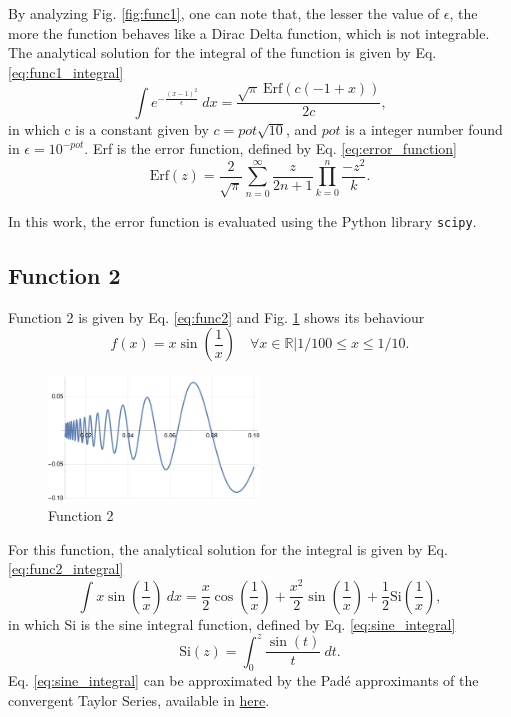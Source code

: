 By analyzing Fig. \ref{fig:func1}, one can note that, the lesser the value of $\epsilon$, the more the function behaves like a Dirac Delta function, which is not integrable. The analytical solution for the integral of the function is given by Eq. \eqref{eq:func1_integral}
\begin{equation}
    \label{eq:func1_integral}
    \int e^{-\frac{(x-1)^2}{\epsilon}} ~dx= \frac{\sqrt{\pi} ~\text{Erf}\left(c (- 1 + x)\right)}{2 c},
\end{equation}
in which c is a constant given by $c = pot\sqrt{10}$, and $pot$ is a integer number found in $\epsilon = 10^{-pot}$. Erf is the error function, defined by Eq. \eqref{eq:error_function}
\begin{equation}
    \label{eq:error_function}
    \text{Erf}(z) = \frac{2}{\sqrt{\pi}} \sum_{n=0}^{\infty} \frac{z}{2n + 1} \prod_{k=0}^{n} \frac{-z^2}{k}.
\end{equation}

In this work, the error function is evaluated using the Python library \texttt{scipy}.
\subsection{Function 2}
Function 2 is given by Eq. \eqref{eq:func2} and Fig. \ref{fig:func2} shows its behaviour
\begin{equation}
    \label{eq:func2}
    f(x) = x\sin\left(\frac{1}{x}\right) \quad \forall x \in \mathbb{R} | 1/100 \leq x \leq 1/10.
\end{equation}
\begin{figure}[H]
    \centering
    \includegraphics[width=0.5\textwidth]{../Figures/func2.pdf}
    \caption{Function 2}
    \label{fig:func2}
\end{figure}

For this function, the analytical solution for the integral is given by Eq. \eqref{eq:func2_integral}
\begin{equation}
    \label{eq:func2_integral}
    \int x\sin\left(\frac{1}{x}\right) ~dx = \frac{x}{2}\cos\left(\frac{1}{x}\right) + \frac{x^2}{2}\sin\left(\frac{1}{x}\right) + \frac{1}{2}\text{Si}\left(\frac{1}{x}\right),
\end{equation}
in which Si is the sine integral function, defined by Eq. \eqref{eq:sine_integral}
\begin{equation}
    \label{eq:sine_integral}
    \text{Si}(z) = \int_{0}^{z} \frac{\sin(t)}{t} ~dt.
\end{equation}
Eq. \eqref{eq:sine_integral} can be approximated by the Pad\'e approximants of the convergent Taylor Series, available in \href{https://en.wikipedia.org/wiki/Trigonometric_integral#Asymptotic_series_(for_large_argument)}{here}.

